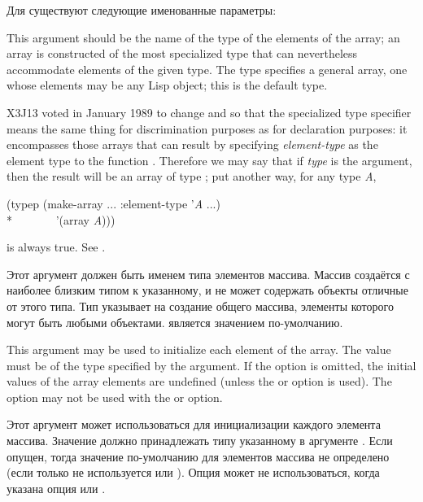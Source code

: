 \begin{defun}[Function]
Для  существуют следующие именованные параметры:

\begin{flushdesc}
\item[\cd{:element-type}]
This argument
should be the name of the type of the elements of the array;
an array is constructed
of the most specialized type that can nevertheless accommodate
elements of the given type.
The type {\true} specifies a general array, one whose elements may
be any Lisp object; this is the default type.

\begin{new}
X3J13 voted in January 1989
to change  and 
so that the specialized  type specifier
means the same thing for discrimination purposes
as for declaration purposes: it encompasses those arrays
that can result by specifying \emph{element-type} as the element type
to the function .  Therefore we may say
that if \emph{type} is the  argument, then
the result will be an array of type ;
put another way, for any type \emph{A},
\begin{lisp}
(typep (make-array ... :element-type '\emph{A} ...) \\*
~~~~~~~'(array \emph{A\/})))
\end{lisp}
is always true.
See .
\end{new}

\item[\cd{:element-type}]
Этот аргумент должен быть именем типа элементов массива.
Массив создаётся с наиболее близким типом к указанному, и не может содержать
объекты отличные от этого типа.
Тип {\true} указывает на создание общего массива, элементы которого могут быть
любыми объектами. {\true} является значением по-умолчанию.

\item[\cd{:initial-element}]
This argument
may be used to initialize each element of the array.  The value
must be of the type specified by the  argument.  If the
 option is omitted, the initial values of the array
elements are undefined (unless the  or
 option is used).
The  option may not be used with the
 or  option.

\item[\cd{:initial-element}]
Этот аргумент может использоваться для инициализации каждого элемента
массива. Значение должно принадлежать типу указанному в аргументе
. Если  опущен, тогда значение
по-умолчанию для элементов массива не определено (если только не используется
 или ).
Опция  может не использоваться, когда указана опция
 или .


\end{flushdesc}
\end{defun}

